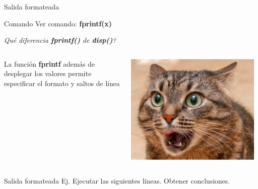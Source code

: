 \documentclass{bredelebeamer}
\begin{document}
\begin{frame}{Salida formateada}
\begin{exampleblock}{Comando}
Ver comando: \textbf{fprintf(x)}
\end{exampleblock}
\begin{center}
\textit{Qué diferencia \textbf{fprintf()} de \textbf{disp()}?}
\end{center}
\begin{columns}
\begin{column}{0.5\textwidth}
\begin{center}
La función \textbf{fprintf} además de desplegar los valores permite especificar el formato y saltos de línea
\end{center}
\end{column}
\begin{column}{0.5\textwidth}
\begin{center}
\includegraphics[scale=0.2]{images/img40.png}
\end{center}
\end{column}
\end{columns}
\end{frame}

\begin{frame}{Salida formateada}
Ej. Ejecutar las siguientes líneas. Obtener conclusiones.
\end{frame}
\end{document}
